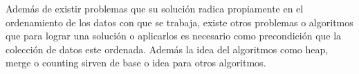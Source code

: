 Además de existir problemas que su solución radica propiamente en el ordenamiento de los datos con que se trabaja, existe otros problemas o algoritmos que para lograr una solución o aplicarlos es necesario como precondición que la colección de datos este ordenada. Además la idea del algoritmos como heap, merge o counting sirven de base o idea para otros algoritmos. 